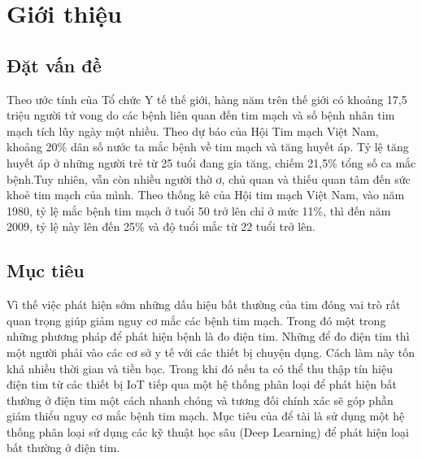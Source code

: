 \chapter{Giới thiệu}
\newpage

\section{Đặt vấn đề}
Theo ước tính của Tổ chức Y tế thế giới, hàng năm trên thế giới có khoảng 17,5 triệu người tử vong do các bệnh liên quan đến tim mạch và số bệnh nhân tim mạch tích lũy ngày một nhiều. Theo dự báo của Hội Tim mạch Việt Nam, khoảng 20\% dân số nước ta mắc bệnh về tim mạch và tăng huyết áp. Tỷ lệ tăng huyết áp ở những người trẻ từ 25 tuổi đang gia tăng, chiếm 21,5\% tổng số ca mắc bệnh.Tuy nhiên, vẫn còn nhiều người thờ ơ, chủ quan và thiếu quan tâm đến sức khoẻ tim mạch của mình. Theo thống kê của Hội tim mạch Việt Nam, vào năm 1980, tỷ lệ mắc bệnh tim mạch ở tuổi 50 trở lên chỉ ở mức 11\%, thì đến năm 2009, tỷ lệ này lên đến 25\% và độ tuổi mắc từ 22 tuổi trở lên.\cite{baibao}\par

\section{Mục tiêu}
Vì thế việc phát hiện sớm những dấu hiệu bất thường của tim đóng vai trò rất quan trọng giúp giảm nguy cơ mắc các bệnh tim mạch. Trong đó một trong những phương pháp để phát hiện bệnh là đo điện tim. Những để đo điện tim thì một người phải vào các cơ sở y tế với các thiết bị chuyện dụng. Cách làm này tốn khá nhiều thời gian và tiền bạc. Trong khi đó nếu ta có thể thu thập tín hiệu điện tim từ các thiết bị IoT tiếp qua một hệ thống phân loại để phát hiện bất thường ở điện tim một cách nhanh chóng và tương đối chính xác sẽ góp phần giám thiểu nguy cơ mắc bệnh tim mạch. Mục tiêu của để tài là sử dụng một hệ thống phân loại sử dụng các kỹ thuật học sâu (Deep Learning) để phát hiện loại bất thường ở điện tim.

